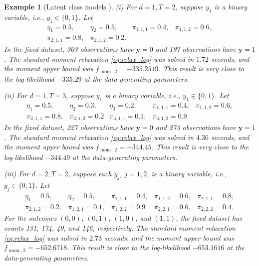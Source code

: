 \documentclass[pdflatex,sn-mathphys-num]{sn-jnl}%
\newcommand{\rd}[1]{{\color{red}#1}}
\newcommand{\vect}[1]{\boldsymbol{#1}}
\theoremstyle{thmstyleone}%
\theoremstyle{thmstyletwo}%
\newtheorem{example}{Example}%
\theoremstyle{thmstylethree}%
\begin{document}
\begin{example}[Latent class models \cite{ChenLCM20}]
	(i) For $d=1, T = 2$, suppose $y_1$ is a binary variable, 
	i.e., $y_1\in\{0,1\}$. Let
	\[\begin{array}{llll}
		\eta_1 = 0.5, &  \eta_2 = 0.5, &  \pi_{1,1,1} = 0.4, &  \pi_{1,1,2} = 0.6,\\
		\pi_{2,1,1} = 0.8, & \pi_{2,1,2} = 0.2.
	\end{array}\] 
    In the fixed dataset, 303 observations have $\vect{y}=0$ and 197 observations have $\vect{y}=1$.
	\rd{The standard moment relaxation \eqref{eq:relax_log} was solved in
	$1.72$ seconds}, and the moment upper bound was
	$f_{\operatorname{mom},2}=-335.2519$.
This result is very close to the log-likelihood $-335.29$ at the
data-generating parameters.
	
	(ii) For $d=1, T=3$, suppose $y_1$ is a binary variable, 
	i.e., $y_1\in\{0,1\}$. Let
	\[
	\begin{array}{lllll}
		\eta_1 = 0.5, & \eta_2 = 0.3, & \eta_3 = 0.2, & \pi_{1,1,1} = 0.4, &  \pi_{1,1,2} = 0.6,\\
		\pi_{2,1,1} = 0.8, & \pi_{2,1,2} = 0.2 & \pi_{3,1,1} = 0.1, & \pi_{3,1,2} = 0.9.
	\end{array}
	\]
    In the fixed dataset, 227 observations have $\vect{y}=0$ and 273 observations have $\vect{y}=1$.
	\rd{The standard moment relaxation \eqref{eq:relax_log} was solved in
	$4.36$ seconds}, and the moment upper bound was
	$f_{\operatorname{mom},2}=-344.45$.
This result is very close to the log-likelihood $-344.49$ at the
data-generating parameters.
	
	
	(iii) For $d=2, T=2$, suppose each $y_j$, $j=1,2$, is a binary variable, 
	i.e., $y_j\in\{0,1\}$. Let
	\[
	\begin{array}{llllll}
		\eta_1 = 0.5, & \eta_2 = 0.5,  & \pi_{1,1,1} = 0.4, &  \pi_{1,1,2} = 0.6,
		& \pi_{2,1,1} = 0.8,\\
		\pi_{2,1,2} = 0.2, & \pi_{1,2,1} = 0.1, & \pi_{1,2,2} = 0.9 & \pi_{2,2,1} = 0.6, & \pi_{2,2,2} = 0.4.
	\end{array}
	\]
    \rd{For the outcomes $(0,0)$, $(0,1)$, $(1,0)$, and $(1,1)$,
    the fixed dataset has counts 131, 174, 49, and 146, respectively.}
	\rd{The standard moment relaxation \eqref{eq:relax_log} was solved in
	$2.73$ seconds}, and the moment upper bound was
	$f_{\operatorname{mom},2}=-652.6718$.
This result is close to \rd{the log-likelihood $-653.1616$ at the
data-generating parameters}.

{\color{red}
\medskip

}
\end{example}
\end{document}

